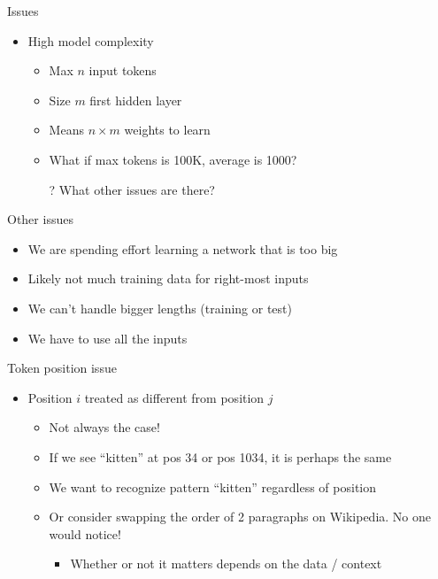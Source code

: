 \documentclass[aspectratio=169]{beamer}
\begin{document}
\begin{frame}{Issues}

\begin{itemize}
	\item High model complexity
	\begin{itemize}
	\item Max $n$ input tokens
	\item Size $m$ first hidden layer
	\item Means $n \times m$ weights to learn
	\item What if max tokens is 100K, average is 1000?
	\vspace{2em}
	\item[?] What other issues are there? 
\end{itemize}
\end{itemize}
\end{frame}
\begin{frame}{Other issues}
	\begin{itemize}
	\item We are spending effort learning a network that is too big
	\item Likely not much training data for right-most inputs
	\item We can't handle bigger lengths (training or test)
	\item We have to use all the inputs
	\end{itemize}
\end{frame}
\begin{frame}{Token position issue}

\begin{itemize}
	\item Position $i$ treated as different from position $j$
	\begin{itemize}
	\item Not always the case!
	\item If we see ``kitten'' at pos 34 or pos 1034, it is perhaps the same
	\item We want to recognize pattern ``kitten'' regardless of position
	\item Or consider swapping the order of 2 paragraphs on Wikipedia. No one would notice!
	\begin{itemize}
	\item Whether or not it matters depends on the data / context
	\end{itemize}
	\end{itemize}
\end{itemize}
\end{frame}
\end{document}
